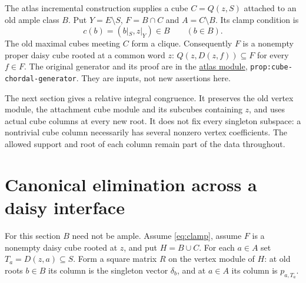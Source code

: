 \documentclass[11pt]{article}
\theoremstyle{definition}
\begin{document}
The atlas incremental construction supplies a cube $C=Q(z,S)$ attached to
an old ample class $B$. Put $Y=E\setminus S$, $F=B\cap C$ and
$A=C\setminus B$. Its clamp condition is
\begin{equation}\label{eq:clamp}
 c(b)=(b|_S,z|_Y)\in B\qquad(b\in B).
\end{equation}
The old maximal cubes meeting $C$ form a clique. Consequently $F$ is a
nonempty proper daisy cube rooted at a common word $z$:
$Q(z,D(z,f))\subseteq F$ for every $f\in F$.
The original generator and its proof are in the
\href{../../minor-atlas/sections/cube_chordal_ample.tex}{atlas module},
\texttt{prop:cube-chordal-generator}. They are inputs, not new assertions here.

The next section gives a relative integral congruence. It preserves the
old vertex module, the attachment cube module and its subcubes containing
$z$, and uses actual cube columns at every new root. It does not fix
every singleton subspace: a nontrivial cube column necessarily has several
nonzero vertex coefficients. The allowed support and root of each column
remain part of the data throughout.

\section{Canonical elimination across a daisy interface}
\label{sec:relative}
For this section $B$ need not be ample. Assume \eqref{eq:clamp}, assume
$F$ is a nonempty daisy cube rooted at $z$, and put $H=B\cup C$.
For each $a\in A$ set $T_a=D(z,a)\subseteq S$. Form a square matrix $R$
on the vertex module of $H$: at old roots $b\in B$ its column is the
singleton vector $\delta_b$, and at $a\in A$ its column is $p_{a,T_a}$.
\end{document}
